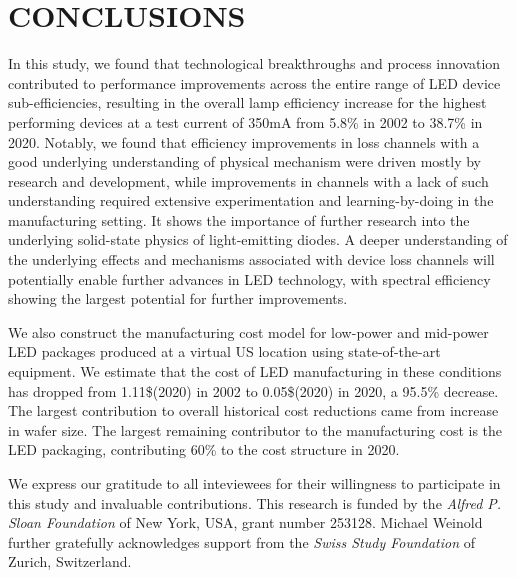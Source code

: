 \documentclass[a4paper,nocompress]{spie}  %
\begin{document}
\section{CONCLUSIONS}

    In this study, we found that technological breakthroughs and process innovation contributed to performance improvements across the entire range of LED device sub-efficiencies, resulting in the overall lamp efficiency increase for the highest performing devices at a test current of 350mA from 5.8\% in 2002 to 38.7\% in 2020. Notably, we found that efficiency improvements in loss channels with a good underlying understanding of physical mechanism were driven mostly by research and development, while improvements in channels with a lack of such understanding required extensive experimentation and learning-by-doing in the manufacturing setting. It shows the importance of further research into the underlying solid-state physics of light-emitting diodes. A deeper understanding of the underlying effects and mechanisms associated with device loss channels will potentially enable further advances in LED technology, with spectral efficiency showing the largest potential for further improvements. 

    We also construct the manufacturing cost model for low-power and mid-power LED packages produced at a virtual US location using state-of-the-art equipment. We estimate that the cost of LED manufacturing in these conditions has dropped from 1.11\$(2020) in 2002 to 0.05\$(2020) in 2020, a 95.5\% decrease. The largest contribution to overall historical cost reductions came from increase in wafer size. The largest remaining contributor to the manufacturing cost is the LED packaging, contributing 60\% to the cost structure in 2020.

\acknowledgments %

We express our gratitude to all inteviewees for their willingness to participate in this study and invaluable contributions. This research is funded by the \textit{Alfred P. Sloan Foundation} of New York, USA, grant number 253128. Michael Weinold further gratefully acknowledges support from the \textit{Swiss Study Foundation} of Zurich, Switzerland.

\clearpage
\end{document}
